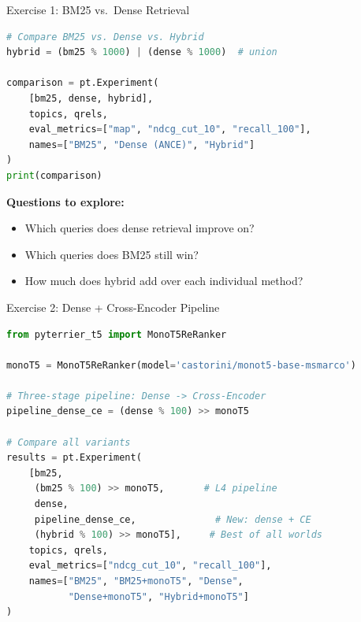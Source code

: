 \documentclass[aspectratio=169]{beamer}
\begin{document}
\begin{frame}[fragile]{Exercise 1: BM25 vs.\ Dense Retrieval}
\begin{lstlisting}[language=Python]
# Compare BM25 vs. Dense vs. Hybrid
hybrid = (bm25 % 1000) | (dense % 1000)  # union

comparison = pt.Experiment(
    [bm25, dense, hybrid],
    topics, qrels,
    eval_metrics=["map", "ndcg_cut_10", "recall_100"],
    names=["BM25", "Dense (ANCE)", "Hybrid"]
)
print(comparison)
\end{lstlisting}

\vspace{0.5em}

\textbf{Questions to explore:}
\begin{itemize}
    \item Which queries does dense retrieval improve on?
    \item Which queries does BM25 still win?
    \item How much does hybrid add over each individual method?
\end{itemize}
\end{frame}

\begin{frame}[fragile]{Exercise 2: Dense + Cross-Encoder Pipeline}
\begin{lstlisting}[language=Python]
from pyterrier_t5 import MonoT5ReRanker

monoT5 = MonoT5ReRanker(model='castorini/monot5-base-msmarco')

# Three-stage pipeline: Dense -> Cross-Encoder
pipeline_dense_ce = (dense % 100) >> monoT5

# Compare all variants
results = pt.Experiment(
    [bm25,
     (bm25 % 100) >> monoT5,       # L4 pipeline
     dense,
     pipeline_dense_ce,              # New: dense + CE
     (hybrid % 100) >> monoT5],     # Best of all worlds
    topics, qrels,
    eval_metrics=["ndcg_cut_10", "recall_100"],
    names=["BM25", "BM25+monoT5", "Dense",
           "Dense+monoT5", "Hybrid+monoT5"]
)
\end{lstlisting}
\end{frame}
\end{document}
